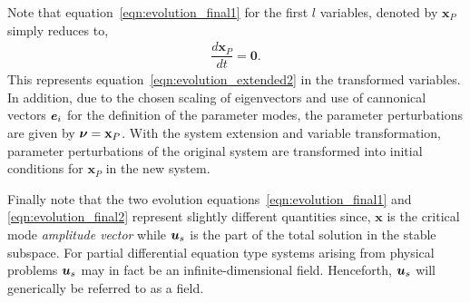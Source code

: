  Note that equation~\eqref{eqn:evolution_final1} for the first $l$ variables, denoted  by $\mathbf{x}_{P}$ simply reduces to,
 \begin{eqnarray} 	
 	\dfrac{d \mathbf{x}_{P}}{d t} = \mathbf{0}. \label{eqn:evolution_xp}
 \end{eqnarray}
This represents equation~\eqref{eqn:evolution_extended2} in the transformed variables. In addition, due to the chosen scaling of eigenvectors and use of cannonical vectors $\boldsymbol{e}_{i}$ for the definition of the parameter modes, the parameter perturbations are given by $\boldsymbol{\nu} = \mathbf{x}_{P}$. With the system extension and variable transformation, parameter perturbations of the original system are transformed into initial conditions for $\mathbf{x}_{P}$ in the new system.

Finally note that the two evolution equations~\eqref{eqn:evolution_final1} and \eqref{eqn:evolution_final2} represent slightly different quantities since, $\mathbf{x}$ is the critical mode \emph{amplitude vector} while $\boldsymbol{u}_{s}$ is the part of the total solution in the stable subspace. For partial differential equation type systems arising from physical problems $\boldsymbol{u}_{s}$ may in fact be an infinite-dimensional field. Henceforth, $\boldsymbol{u}_{s}$ will generically be referred to as a field. 

